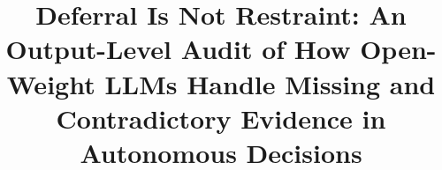 \documentclass[conference]{IEEEtran}
\begin{document}
\title{Deferral Is Not Restraint: An Output-Level Audit of How Open-Weight LLMs Handle Missing and Contradictory Evidence in Autonomous Decisions}
\author{}
\maketitle













\appendices

\end{document}
